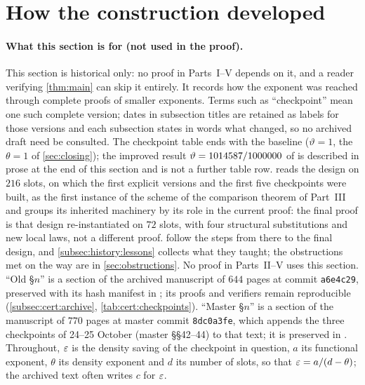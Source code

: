 \providecommand{\ContinuationExponent}{\frac{4066280877}{355000000000000}}
\providecommand{\ContinuationTheta}{0.999999999794}
\providecommand{\AdvanceExponent}{\frac{8855891201}{710000000000000}}
\providecommand{\AdvanceTheta}{0.999999999862}
\providecommand{\FurtherExponent}{\frac{887239883}{71000000000000}}
\providecommand{\FurtherTheta}{0.99999999966289}
\section{How the construction developed}\label{sec:history}

\paragraph{What this section is for (not used in the proof).}
This section is historical only: no proof in Parts~I--V depends on
it, and a reader verifying \cref{thm:main} can skip it entirely.
It records how the exponent was reached through complete proofs of
smaller exponents. Terms such as ``checkpoint'' mean one such
complete version; dates in subsection titles are retained as
labels for those versions and each subsection states in words what
changed, so no archived draft need be consulted. The checkpoint
table ends with the baseline ($\vartheta=1$, the $\theta=1$ of \cref{sec:closing}); the improved result
$\vartheta=1014587/1000000$ of
 is
described in prose at the end of this section and is not a further
table row.
 reads the design on $216$ slots, on which the first
explicit versions and the first five checkpoints were built, as the first
instance of the scheme of the comparison theorem of Part~III and groups its inherited machinery by its role in the current proof: the final proof is that design
re-instantiated on $72$ slots, with four structural substitutions and new
local laws, not a different proof.
follow the steps from there to the final design, and
\cref{subsec:history:lessons} collects what they taught; the obstructions met
on the way are in \cref{sec:obstructions}. No proof in Parts~II--V uses this
section. ``Old \S$n$'' is a section of the archived manuscript of $644$ pages
at commit \texttt{a6e4c29}, preserved with its hash manifest in
; its proofs and verifiers
remain reproducible (\cref{subsec:cert:archive}, \cref{tab:cert:checkpoints}).
``Master \S$n$'' is a section of the manuscript of $770$ pages at master
commit \texttt{8dc0a3fe}, which appends the three checkpoints of 24--25
October (master \S\S42--44) to that text; it is preserved in
.
Throughout, $\varepsilon$ is the density saving of
the checkpoint in question, $a$ its functional exponent, $\theta$ its density
exponent and $d$ its number of slots, so that $\varepsilon=a/(d-\theta)$; the
archived text often writes $c$ for $\varepsilon$.

